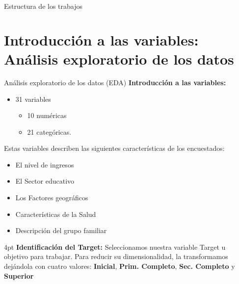 \documentclass[pdf]{beamer}
\def\vspace{}%
\begin{document}
{\begin{frame}{Estructura de los trabajos}
\begin{enumerate}
    \end{enumerate}

\end{frame}

\section{Introducción a las variables: Análisis exploratorio de los datos}

\begin{frame}{Análisis exploratorio de los datos (EDA)}
\textbf{Introducción a las variables:}
\begin{itemize} 
    \item 31 variables
    \begin{itemize} 
        \item 10 numéricas 
        \item 21 categóricas. 
    \end{itemize}
\end{itemize}
Estas variables describen las siguientes características de los encuestados:
\begin{itemize} 
    \item El nivel de ingresos
    \item El Sector educativo
    \item Los Factores geográficos
    \item Características de la Salud
    \item Descripción del grupo familiar
\end{itemize}
 \vspace{4pt}
 \textbf{Identificación del Target:} Seleccionamos nuestra variable Target u objetivo para trabajar. Para reducir su dimensionalidad, la transformamos dejándola con cuatro valores:  \textbf{Inicial}, \textbf{Prim. Completo}, \textbf{Sec. Completo} y \textbf{Superior}
\end{frame}
 
}
\end{document}
